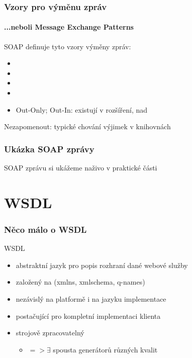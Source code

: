 \documentclass[12pt]{beamer}
\begin{document}
\begin{frame}
  \frametitle{Vzory pro výměnu zpráv}
  \framesubtitle{...neboli Message Exchange Patterns}

  \begin{block}{SOAP definuje tyto vzory výměny zpráv:}
    \begin{itemize}
      \item {} 
      \item {} 
      \item {} 
      \item {}
      \vspace{4mm}
      \item Out-Only; Out-In: existují v rozšíření, nad 
    \end{itemize}
  \end{block}

  {\small Nezapomenout: typické chování výjimek v knihovnách}
\end{frame}

\begin{frame}
  \frametitle{Ukázka SOAP zprávy}
  
  \begin{example}
    SOAP zprávu si ukážeme naživo v praktické části
  \end{example}
\end{frame}

\section{WSDL}

\begin{frame}
  \frametitle{Něco málo o WSDL}


  \begin{block}{WSDL}
    \begin{itemize}
      \item abstraktní jazyk pro popis rozhraní dané webové služby
      \item založený na  (xmlns, xmlschema, q-names)
      \item nezávislý na platformě i na jazyku implementace
      \item postačující pro kompletní implementaci klienta
      \item strojově zpracovatelný
      \begin{itemize}
        \item $=> \exists$ spousta generátorů různých kvalit
      \end{itemize}
    \end{itemize}
  \end{block}
\end{frame}
\end{document}
